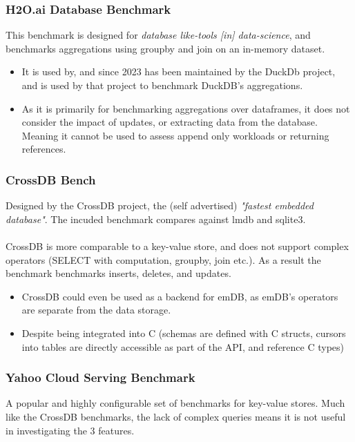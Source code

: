 \subsubsection{H2O.ai Database Benchmark}
This benchmark is designed for \textit{database like-tools [in] data-science}, and benchmarks aggregations
using groupby and join on an in-memory dataset\cite{H2Oai}.
\begin{itemize}
    \setlength\itemsep{0em}
    \item It is used by, and since 2023 has been maintained by the DuckDb project\cite{DuckDBH2O}, and is used by that project to benchmark DuckDB's
          aggregations.
    \item As it is primarily for benchmarking aggregations over dataframes, it does not consider the impact of updates, or extracting
          data from the database. Meaning it cannot be used to assess append only workloads or returning references.
\end{itemize}
\subsubsection{CrossDB Bench}
Designed by the CrossDB project, the (self advertised) \textit{"fastest embedded database"}\cite{CrossDBWebsite}. The incuded benchmark compares against lmdb and sqlite3.
\\
\\ CrossDB is more comparable to a key-value store, and does not support complex operators (SELECT with computation, groupby, join etc.).
As a result the benchmark benchmarks inserts, deletes, and updates.
\begin{itemize}
    \setlength\itemsep{0em}
    \item CrossDB could even be used as a backend for emDB, as emDB's operators are separate from the data storage.
    \item Despite being integrated into C (schemas are defined with C structs, cursors into tables are directly accessible as part of the API,
          and reference C types)
\end{itemize}

\subsubsection{Yahoo Cloud Serving Benchmark}
A popular and highly configurable set of benchmarks for key-value stores. Much like the CrossDB
benchmarks, the lack of complex queries means it is not useful in investigating the 3 features.

